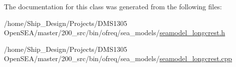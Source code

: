 The documentation for this class was generated from the following files\-:\begin{DoxyCompactItemize}
\item 
/home/\-Ship\-\_\-\-Design/\-Projects/\-D\-M\-S1305 Open\-S\-E\-A/master/200\-\_\-src/bin/ofreq/sea\-\_\-models/\hyperlink{seamodel__longcrest_8h}{seamodel\-\_\-longcrest.\-h}\item 
/home/\-Ship\-\_\-\-Design/\-Projects/\-D\-M\-S1305 Open\-S\-E\-A/master/200\-\_\-src/bin/ofreq/sea\-\_\-models/\hyperlink{seamodel__longcrest_8cpp}{seamodel\-\_\-longcrest.\-cpp}\end{DoxyCompactItemize}
